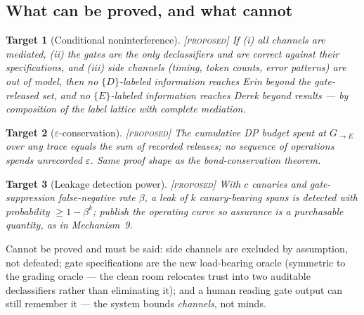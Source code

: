 \documentclass[11pt,a4paper]{article}
\newtheorem{target}{Target}[section]
\theoremstyle{definition}
\theoremstyle{remark}
\newcommand{\grade}[1]{\textsc{[#1]}}
\begin{document}
\subsection{What can be proved, and what cannot}
\begin{target}[Conditional noninterference]\grade{proposed} If (i) all channels are mediated, (ii) the gates are the only declassifiers and are correct against their specifications, and (iii) side channels (timing, token counts, error patterns) are out of model, then no $\{D\}$-labeled information reaches Erin beyond the gate-released set, and no $\{E\}$-labeled information reaches Derek beyond results --- by composition of the label lattice with complete mediation. \end{target}
\begin{target}[$\varepsilon$-conservation]\grade{proposed} The cumulative DP budget spent at $G_{\to E}$ over any trace equals the sum of recorded releases; no sequence of operations spends unrecorded $\varepsilon$. Same proof shape as the bond-conservation theorem. \end{target}
\begin{target}[Leakage detection power]\grade{proposed} With $c$ canaries and gate-suppression false-negative rate $\beta$, a leak of $k$ canary-bearing spans is detected with probability $\ge 1 - \beta^{k}$; publish the operating curve so assurance is a purchasable quantity, as in Mechanism~9. \end{target}
Cannot be proved and must be said: side channels are excluded by assumption, not defeated; gate specifications are the new load-bearing oracle (symmetric to the grading oracle --- the clean room relocates trust into two auditable declassifiers rather than eliminating it); and a human reading gate output can still remember it --- the system bounds \emph{channels}, not minds.
\end{document}
